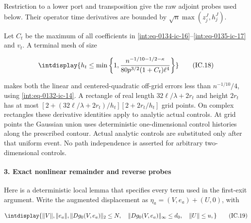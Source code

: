 
Restriction to a lower port and transposition give the raw adjoint probes used below. Their operator time derivatives are bounded by \(\sqrt n\max(z_j^J,\allowbreak h_j^J)\).



Let \(C_t\) be the maximum of all coefficients in \eqref{int:eq-0134-ic-16}--\allowbreak \eqref{int:eq-0135-ic-17} and \(v_t\). A terminal mesh of size


\begingroup\renewcommand{\theHequation}{intdisplay.317}
\begin{equation}
\intdisplay{
h_t\le\min\left\{1,
 \frac{n^{-1/10-1/2-\kappa}}{80p^{3/2}(1+C_t)\ell^4}\right\}
}
\tag{IC.18}
\label{int:eq-0136-ic-18}
\end{equation}
\endgroup


makes both the linear and centered-quadratic off-grid errors less than \(n^{-1/10}/4\), using \eqref{int:eq-0132-ic-14}. A rectangle of real length \(32\ell/\lambda+2r_t\) and height \(2r_t\) has at most \([2+(32\ell/\lambda+2r_t)/h_t][2+2r_t/h_t]\) grid points. On complex rectangles these derivative identities apply to analytic actual controls. At grid points the Gaussian union uses deterministic one-dimensional control histories along the prescribed contour. Actual analytic controls are substituted only after that uniform event. No path independence is asserted for arbitrary two-dimensional controls.


\paragraph{3. Exact nonlinear remainder and reverse probes}

\mbox{}\par\smallskip


Here is a deterministic local lemma that specifies every term used in the first-exit argument. Write the augmented displacement as \(\eta_a=(V,\allowbreak e_a)+(U,\allowbreak 0)\), with


\begingroup\renewcommand{\theHequation}{intdisplay.318}
\begin{equation}
\intdisplay{
\|V\|,\|e_a\|,\|Dg_0(V,e_a)\|_2\le N,
 \quad\|Dg_0(V,e_a)\|_\infty\le d_0,\quad\|U\|\le u,
}
\tag{IC.19}
\label{int:eq-0137-ic-19}
\end{equation}
\endgroup


